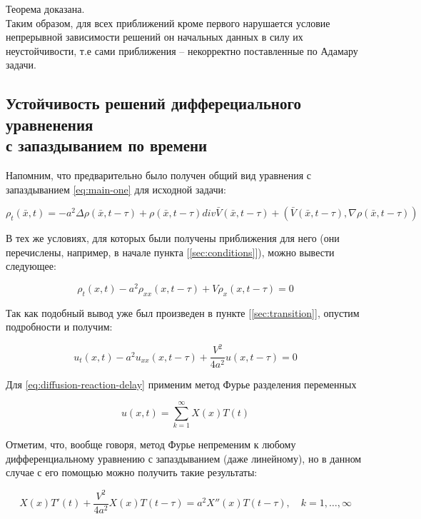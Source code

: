 Теорема доказана.\\

Таким образом, для всех приближений кроме первого нарушается условие непрерывной зависимости решений он начальных данных в силу их неустойчивости, т.е сами приближения \--- некорректно поставленные по Адамару задачи.

\subsection{Устойчивость решений дифферециального уравненения\\с запаздыванием по времени}

Напомним, что предварительно было получен общий вид уравнения с запаздыванием \ref{eq:main-one} для исходной задачи:

\begin{equation*}
\rho_t(\bar{x},t) = -a^2 \Delta \rho(\bar{x},t-\tau) + \rho(\bar{x},t-\tau) div \bar{V}(\bar{x},t-\tau) + (\bar{V}(\bar{x},t-\tau),\nabla \rho(\bar{x},t-\tau))
\end{equation*}

В тех же условиях, для которых были получены приближения для него (они перечислены, например, в начале пункта [\ref{sec:conditions}]), можно вывести следующее:

\begin{equation}
\rho_t (x,t) - a^2 \rho_{xx} (x,t-\tau) + V \rho_x (x,t-\tau) = 0
\end{equation}

Так как подобный вывод уже был произведен в пункте [\ref{sec:transition}], опустим подробности и получим:

\begin{equation}\label{eq:diffusion-reaction-delay}
u_t (x,t) - a^2 u_{xx} (x,t-\tau) + \dfrac{V^2}{4a^2} u (x,t-\tau) = 0
\end{equation}

Для \ref{eq:diffusion-reaction-delay} применим метод Фурье разделения переменных

\begin{equation}
u(x,t) = \sum\limits_{k=1}^{\infty} X(x) T(t)
\end{equation}

Отметим, что, вообще говоря, метод Фурье непременим к любому дифференциальному уравнению с запаздыванием (даже линейному), но в данном случае с его помощью можно получить такие результаты:

\begin{equation}
X(x) T'(t) + \dfrac{V^2}{4a^2} X(x) T(t-\tau) =a^2 X''(x) T(t-\tau), \quad k=1,\dots,\infty
\end{equation}

